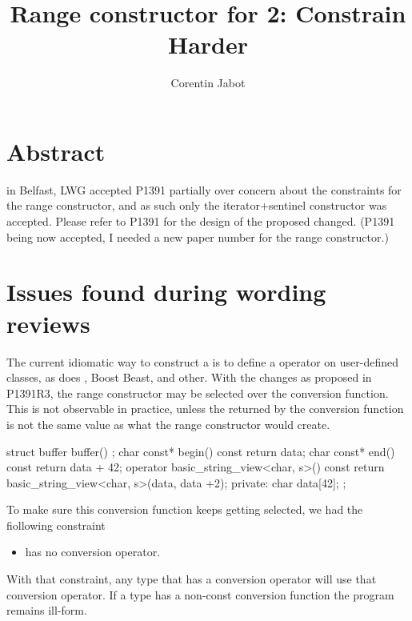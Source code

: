 \documentclass{wg21}
\title{Range constructor for \tcode{std::string\_view} 2: Constrain Harder}
\author{Corentin Jabot}{corentin.jabot@gmail.com}
\begin{document}
\maketitle

\section{Abstract}

in Belfast, LWG accepted P1391 partially over concern about the constraints for the range constructor, and as such only the iterator+sentinel
constructor was accepted. Please refer to P1391 for the design of the proposed changed.
(P1391 being now accepted, I needed a new paper number for the range constructor.)


\section{Issues found during wording reviews}

The current idiomatic way to construct a  is to define a  operator on user-defined classes, 
as does ,  Boost Beast,  and other.
With the changes as proposed in P1391R3, the range constructor may be selected over the conversion function.
This is not observable in practice, unless the  returned by the conversion function is not the same value as what the range constructor would create.

\begin{colorblock}
struct buffer {
   buffer() {};
   char const* begin() const { return data; }
   char const* end() const { return data + 42; }
   operator basic_string_view<char, s>() const{
      return basic_string_view<char, s>(data, data +2);
   }
private:
   char data[42];
};
\end{colorblock}

To make sure this conversion function keeps getting selected, we had the fiollowing constraint

\begin{itemize}

\item {} has no  conversion operator.

\end{itemize}

With that constraint, any type that has a conversion operator will use that conversion operator.
If a  type has a non-const conversion function the program remains ill-form.
\end{document}
